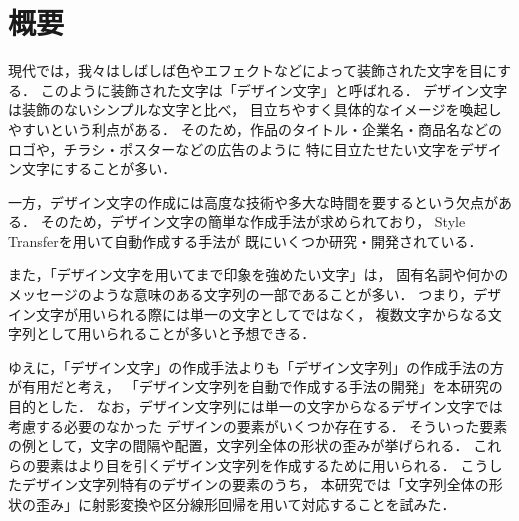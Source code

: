 \documentclass[\homedir/main.tex]{subfiles}
\begin{document}
\chapter*{概要}\label{chap:abstract}%
現代では，我々はしばしば色やエフェクトなどによって装飾された文字を目にする．
このように装飾された文字は「デザイン文字」と呼ばれる．
デザイン文字は装飾のないシンプルな文字と比べ，
目立ちやすく具体的なイメージを喚起しやすいという利点がある．
そのため，作品のタイトル・企業名・商品名などのロゴや，チラシ・ポスターなどの広告のように
特に目立たせたい文字をデザイン文字にすることが多い．

一方，デザイン文字の作成には高度な技術や多大な時間を要するという欠点がある．
そのため，デザイン文字の簡単な作成手法が求められており，
Style Transferを用いて自動作成する手法が
既にいくつか研究・開発されている．

また，「デザイン文字を用いてまで印象を強めたい文字」は，
固有名詞や何かのメッセージのような意味のある文字列の一部であることが多い．
つまり，デザイン文字が用いられる際には単一の文字としてではなく，
複数文字からなる文字列として用いられることが多いと予想できる．

ゆえに，「デザイン文字」の作成手法よりも「デザイン文字列」の作成手法の方が有用だと考え，
「デザイン文字列を自動で作成する手法の開発」を本研究の目的とした．
なお，デザイン文字列には単一の文字からなるデザイン文字では考慮する必要のなかった
デザインの要素がいくつか存在する．
そういった要素の例として，文字の間隔や配置，文字列全体の形状の歪みが挙げられる．
これらの要素はより目を引くデザイン文字列を作成するために用いられる．
こうしたデザイン文字列特有のデザインの要素のうち，
本研究では「文字列全体の形状の歪み」に射影変換や区分線形回帰を用いて対応することを試みた．
\end{document}
